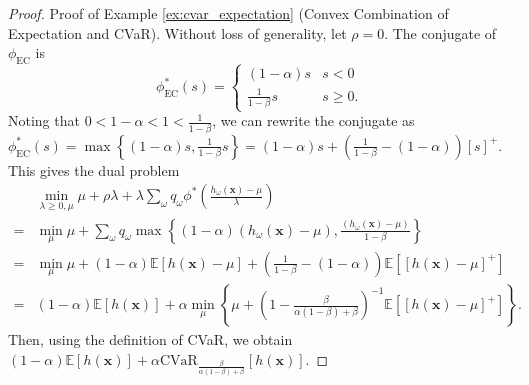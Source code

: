 \documentclass[opre,nonblindrev]{informs3} %
\newcommand{\E}{\mathbb{E}}
\newcommand{\e}[1]{\E \left[ #1 \right]}
\newcommand{\x}{\mathbf{x}}
\begin{document}
\begin{APPENDICES}
\begin{proof}{\sc Proof of Example \ref{ex:cvar_expectation} (Convex Combination of Expectation and CVaR).}
	Without loss of generality, let $\rho = 0$.
	The conjugate of $\phi_{\text{EC}}$ is
	\[
		\phi_{\text{EC}}^*(s) =
		\begin{cases}
			(1-\alpha) s & s < 0 \\
			\frac{1}{1-\beta} s & s \geq 0.
		\end{cases}
	\]
	Noting that $0<1-\alpha < 1 < \frac{1}{1-\beta}$, we can rewrite the conjugate as $\phi_{\text{EC}}^*(s) = \max \left\{ (1-\alpha) s, \frac{1}{1-\beta} s \right\} = (1-\alpha) s + \left( \frac{1}{1-\beta} - (1-\alpha) \right) [s]^+$. 
	This gives the dual problem
	\begin{align*}
		& \min_{\lambda \geq 0,\mu}  \mu + \rho \lambda + \lambda \sum_\omega q_\omega \phi^*\left(\frac{h_\omega(\x)-\mu}{\lambda}\right) \\
		= & \min_\mu \mu + \sum_\omega q_\omega \max \left\{ (1-\alpha)(h_\omega(\x)-\mu), \frac{(h_\omega(\x)-\mu)}{1-\beta} \right\} \\
		= & \min_\mu \mu + (1-\alpha)\e{h(\x)-\mu} + \left( \frac{1}{1-\beta} - (1-\alpha) \right) \e{[h(\x)-\mu]^+} \\ 
		= & (1-\alpha)\e{h(\x)} + \alpha \min_\mu \left\{ \mu + \left(1 - \frac{\beta}{\alpha(1-\beta)+\beta}\right)^{-1} \e{[h(\x)-\mu]^+} \right\}. 
	\end{align*}
	Then, using the definition of CVaR, we obtain
	$%
		(1-\alpha)\e{h(\x)} + \alpha \mbox{CVaR}_{\frac{\beta}{\alpha(1-\beta)+\beta}}[h(\x)]. 
	$%
	\Halmos 
%
%
\end{proof}

 
 \end{APPENDICES}
\end{document}
